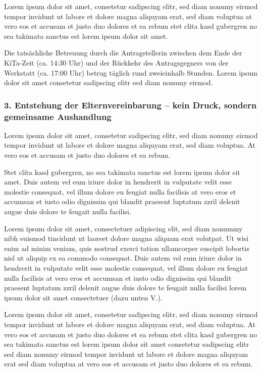 \documentclass[
  11pt,
  a4paper,
]{article}
\begin{document}
Lorem ipsum dolor sit amet, consetetur sadipscing elitr, sed diam nonumy
eirmod tempor invidunt ut labore et dolore magna aliquyam erat, sed diam
voluptua at vero eos et accusam et justo duo dolores et ea rebum stet
clita kasd gubergren no sea takimata sanctus est lorem ipsum dolor sit
amet.

Die tatsächliche Betreuung durch die Antragstellerin zwischen dem Ende
der KiTa-Zeit (ca. 14:30 Uhr) und der Rückkehr des Antragsgegners von
der Werkstatt (ca. 17:00 Uhr) betrug täglich rund zweieinhalb Stunden.
Lorem ipsum dolor sit amet consetetur sadipscing elitr sed diam nonumy
eirmod.

\subsubsection{3. Entstehung der Elternvereinbarung -- kein Druck,
sondern gemeinsame
Aushandlung}\label{entstehung-der-elternvereinbarung-kein-druck-sondern-gemeinsame-aushandlung}

Lorem ipsum dolor sit amet, consetetur sadipscing elitr, sed diam nonumy
eirmod tempor invidunt ut labore et dolore magna aliquyam erat, sed diam
voluptua. At vero eos et accusam et justo duo dolores et ea rebum.

Stet clita kasd gubergren, no sea takimata sanctus est lorem ipsum dolor
sit amet. Duis autem vel eum iriure dolor in hendrerit in vulputate
velit esse molestie consequat, vel illum dolore eu feugiat nulla
facilisis at vero eros et accumsan et iusto odio dignissim qui blandit
praesent luptatum zzril delenit augue duis dolore te feugait nulla
facilisi.

Lorem ipsum dolor sit amet, consectetuer adipiscing elit, sed diam
nonummy nibh euismod tincidunt ut laoreet dolore magna aliquam erat
volutpat. Ut wisi enim ad minim veniam, quis nostrud exerci tation
ullamcorper suscipit lobortis nisl ut aliquip ex ea commodo consequat.
Duis autem vel eum iriure dolor in hendrerit in vulputate velit esse
molestie consequat, vel illum dolore eu feugiat nulla facilisis at vero
eros et accumsan et iusto odio dignissim qui blandit praesent luptatum
zzril delenit augue duis dolore te feugait nulla facilisi lorem ipsum
dolor sit amet consectetuer (dazu unten V.).

Lorem ipsum dolor sit amet, consetetur sadipscing elitr, sed diam nonumy
eirmod tempor invidunt ut labore et dolore magna aliquyam erat, sed diam
voluptua. At vero eos et accusam et justo duo dolores et ea rebum stet
clita kasd gubergren no sea takimata sanctus est lorem ipsum dolor sit
amet consetetur sadipscing elitr sed diam nonumy eirmod tempor invidunt
ut labore et dolore magna aliquyam erat sed diam voluptua at vero eos et
accusam et justo duo dolores et ea rebum.
\end{document}

